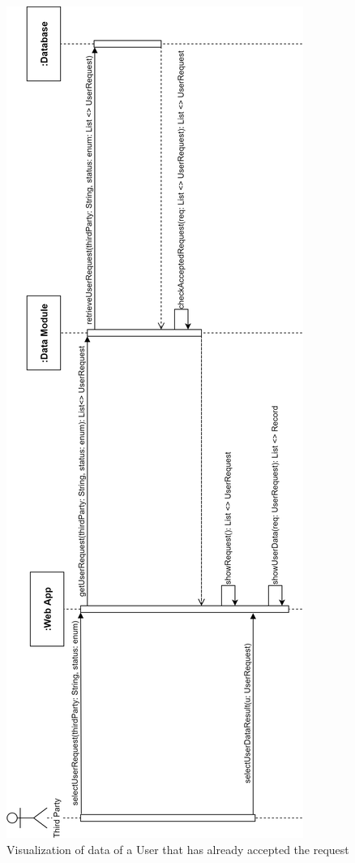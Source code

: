 \begin{figure}[H]
    \centering
    \includegraphics[scale=0.22]{DD/Pictures/showDataResultV.png}
    \caption{Visualization of data of a User that has already accepted the request}
\end{figure}

